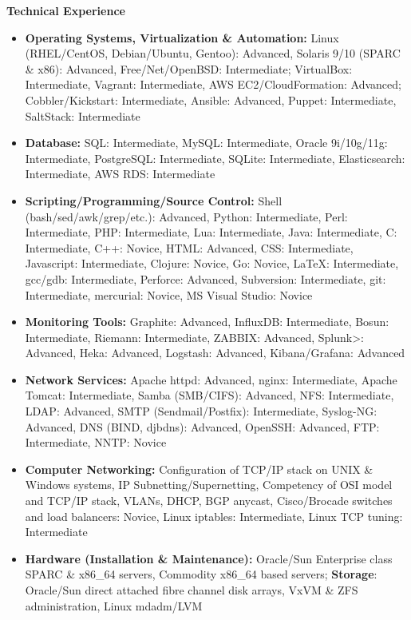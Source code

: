 \documentclass[10pt,oneside]{article}
\newenvironment{ressection}[1]{
  \vspace{4pt}
  \textbf{\selectfont\normalsize#1}
  \begin{itemize}
  \vspace{3pt}
}{
  \end{itemize}
}
\newcommand{\resitem}[1]{
  \vspace{-4pt}
  \item \begin{flushleft} #1 \end{flushleft}
}
\begin{document}
\begin{ressection}{Technical Experience}

  \resitem{\textbf{Operating Systems, Virtualization \& Automation:} Linux (RHEL/CentOS, Debian/Ubuntu, Gentoo): Advanced, Solaris 9/10 (SPARC \& x86): Advanced, Free/Net/OpenBSD: Intermediate; VirtualBox: Intermediate, Vagrant: Intermediate, AWS EC2/CloudFormation: Advanced; Cobbler/Kickstart: Intermediate, Ansible: Advanced, Puppet: Intermediate, SaltStack: Intermediate}

  \resitem{\textbf{Database:} SQL: Intermediate, MySQL: Intermediate, Oracle 9i/10g/11g: Intermediate, PostgreSQL: Intermediate, SQLite: Intermediate, Elasticsearch: Intermediate, AWS RDS: Intermediate}

  \resitem{\textbf{Scripting/Programming/Source Control:} Shell (bash/sed/awk/grep/etc.): Advanced, Python: Intermediate, Perl: Intermediate, PHP: Intermediate, Lua: Intermediate, Java: Intermediate, C: Intermediate, C++: Novice, HTML: Advanced, CSS: Intermediate, Javascript: Intermediate, Clojure: Novice, Go: Novice, \LaTeX: Intermediate, gcc/gdb: Intermediate, Perforce: Advanced, Subversion: Intermediate, git: Intermediate, mercurial: Novice, MS Visual Studio: Novice}

  \resitem{\textbf{Monitoring Tools:} Graphite: Advanced, InfluxDB: Intermediate, Bosun: Intermediate, Riemann: Intermediate, ZABBIX: Advanced, Splunk>: Advanced, Heka: Advanced, Logstash: Advanced, Kibana/Grafana: Advanced}

  \resitem{\textbf{Network Services:} Apache httpd: Advanced, nginx: Intermediate, Apache Tomcat: Intermediate, Samba (SMB/CIFS): Advanced, NFS: Intermediate, LDAP: Advanced, SMTP (Sendmail/Postfix): Intermediate, Syslog-NG: Advanced, DNS (BIND, djbdns): Advanced, OpenSSH: Advanced, FTP: Intermediate, NNTP: Novice}

  \resitem{\textbf{Computer Networking:} Configuration of TCP/IP stack on UNIX \& Windows systems, IP Subnetting/Supernetting, Competency of OSI model and TCP/IP stack, VLANs, DHCP, BGP anycast, Cisco/Brocade switches and load balancers: Novice, Linux iptables: Intermediate, Linux TCP tuning: Intermediate}

  \resitem{\textbf{Hardware (Installation \& Maintenance):} Oracle/Sun Enterprise class SPARC \& x86\_64 servers, Commodity x86\_64 based servers; \textbf{Storage}: Oracle/Sun direct attached fibre channel disk arrays, VxVM \& ZFS administration, Linux mdadm/LVM}

\end{ressection}
\end{document}
